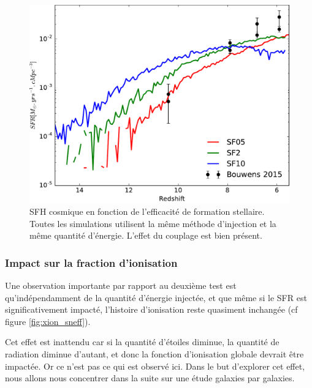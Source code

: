 \begin{figure}
        \includegraphics[width=.95\textwidth]{img/03/sedov/SFR_sfeff.pdf} 
        \caption[SFH cosmique en fonction de l'efficacité de formation stellaire]{SFH cosmique en fonction de l'efficacité de formation stellaire.
        Toutes les simulations utilisent la même méthode d'injection et la même quantité d'énergie.
		L'effet du couplage est bien présent.
        }
 		\label{fig:sfr_sfe}
\end{figure}

\subsubsection{Impact sur la fraction d'ionisation}
\label{sec:pbfesc}
Une observation importante par rapport au deuxième test est qu’indépendamment de la quantité d'énergie injectée, et que même si le \ac{SFR} est significativement impacté, l'histoire d'ionisation reste quasiment inchangée (cf figure \ref{fig:xion_sneff}).

Cet effet est inattendu car si la quantité d'étoiles diminue, la quantité de radiation diminue d'autant, et donc la fonction d'ionisation globale devrait être impactée.
Or ce n'est pas ce qui est observé ici.
Dans le but d'explorer cet effet, nous allons nous concentrer dans la suite sur une étude galaxies par galaxies.

